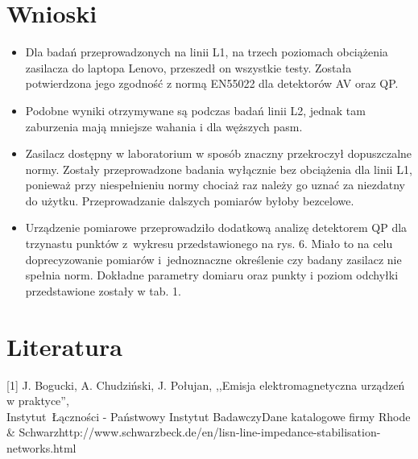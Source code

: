 \documentclass[12pt, a4paper, oneside]{article}
\begin{document}
\section{Wnioski}
\begin{itemize}
\item Dla badań przeprowadzonych na linii L1, na trzech poziomach obciążenia zasilacza do laptopa Lenovo, przeszedł on wszystkie testy. Została potwierdzona jego zgodność z normą EN55022 dla detektorów AV oraz QP.
\item Podobne wyniki otrzymywane są podczas badań linii L2, jednak tam zaburzenia mają mniejsze wahania i dla węższych pasm.
\item Zasilacz dostępny w laboratorium w sposób znaczny przekroczył dopuszczalne normy. Zostały przeprowadzone badania wyłącznie bez obciążenia dla linii L1, ponieważ przy niespełnieniu normy chociaż raz należy go uznać za niezdatny do użytku. Przeprowadzanie dalszych pomiarów byłoby bezcelowe.
\item Urządzenie pomiarowe przeprowadziło dodatkową analizę detektorem QP dla trzynastu punktów z~wykresu przedstawionego na rys. 6. Miało to na celu doprecyzowanie pomiarów i~jednoznaczne określenie czy badany zasilacz nie spełnia norm. Dokładne parametry domiaru oraz punkty i poziom odchyłki przedstawione zostały w tab. 1.
\end{itemize}
\clearpage
\section{Literatura}
[1] J. Bogucki, A. Chudziński, J. Połujan, ,,Emisja elektromagnetyczna urządzeń w praktyce'',\\ Instytut~Łączności - Państwowy Instytut Badawczy\newline\newline
[2] Dane katalogowe firmy Rhode \& Schwarz\newline\newline
[3] http://www.schwarzbeck.de/en/lisn-line-impedance-stabilisation-networks.html \newline\newline
\end{document}
